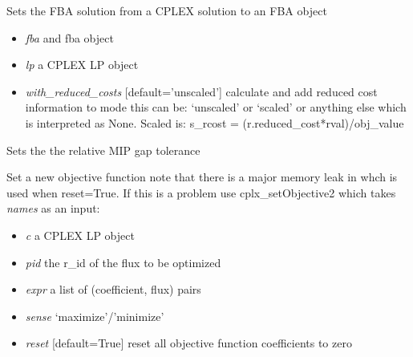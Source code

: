 \documentclass[a4paper,11pt,english]{sphinxmanual}
\begin{document}

\begin{fulllineitems}
\label{modules_doc:cbmpy.CBCPLEX.cplx_setFBAsolutionToModel}
Sets the FBA solution from a CPLEX solution to an FBA object
\begin{itemize}
\item {} 
\emph{fba} and fba object

\item {} 
\emph{lp} a CPLEX LP object

\item {} 
\emph{with\_reduced\_costs} {[}default='unscaled'{]} calculate and add reduced cost information to mode this can be: `unscaled' or `scaled'
or anything else which is interpreted as None. Scaled is: s\_rcost = (r.reduced\_cost*rval)/obj\_value

\end{itemize}

\end{fulllineitems}


\begin{fulllineitems}
\label{modules_doc:cbmpy.CBCPLEX.cplx_setMIPGapTolerance}
Sets the the relative MIP gap tolerance

\end{fulllineitems}


\begin{fulllineitems}
\label{modules_doc:cbmpy.CBCPLEX.cplx_setObjective}
Set a new objective function note that there is a major memory leak in
 whch is used when reset=True. If this is a problem
use cplx\_setObjective2 which takes \emph{names} as an input:
\begin{itemize}
\item {} 
\emph{c} a CPLEX LP object

\item {} 
\emph{pid} the r\_id of the flux to be optimized

\item {} 
\emph{expr} a list of (coefficient, flux) pairs

\item {} 
\emph{sense} `maximize'/'minimize'

\item {} 
\emph{reset} {[}default=True{]} reset all objective function coefficients to zero

\end{itemize}

\end{fulllineitems}
\end{document}
